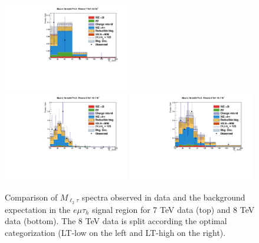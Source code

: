 \begin{figure}
\begin{center}
  \includegraphics[width=0.49\textwidth]{4_Analisys/pics/7TeV/plots/emt/LTCut/final-subMass-LTCut.pdf}\\
  \includegraphics[width=0.49\textwidth]{4_Analisys/pics/8TeV/plots/emt/LTLow/final-subMass-LTLow.pdf}
  \includegraphics[width=0.49\textwidth]{4_Analisys/pics/8TeV/plots/emt/LTHigh/final-subMass-LTHigh.pdf}\\
  \caption{
    Comparison of $M_{\ell_2\tau}$ spectra observed in data and the background expectation %
  in the $e\mu\tau_h$ signal region for 7 TeV data (top) and 8 TeV data (bottom). The 8 TeV data is split according the optimal categorization (LT-low on the left and LT-high on the right).
  }
  \label{fig:LLT_emt_prefit}
\end{center}
\end{figure}

